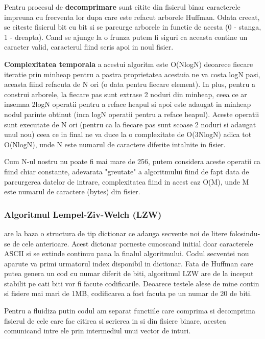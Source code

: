 \documentclass[runningheads]{llncs}
\begin{document}
Pentru procesul de \textbf{decomprimare} sunt citite din fisierul binar caracterele impreuna cu frecventa lor dupa care este refacut arborele
Huffman. Odata creeat, se citeste fisierul bit cu bit si se parcurge arborele in functie de acesta (0 - stanga, 1 - dreapta).
Cand se ajunge la o frunza putem fi siguri ca aceasta contine un caracter valid, caracterul fiind scris apoi in noul fisier.

\textbf{Complexitatea temporala} a acestui algoritm este O(NlogN) deoarece fiecare iteratie prin minheap pentru a pastra proprietatea
acestuia ne va costa logN pasi, aceasta fiind refacuta de N ori (o data pentru fiecare element).
In plus, pentru a construi arborele, la fiecare pas sunt extrase 2 noduri din minheap, ceea ce ar insemna 2logN operatii pentru a reface heapul
si apoi este adaugat in minheap nodul parinte obtinut (inca logN operatii pentru a reface heapul). Aceste operatii sunt executate de N ori (pentru
ca la fiecare pas sunt scoase 2 noduri si adaugat unul nou) ceea ce in final ne va duce la o complexitate de O(3NlogN) adica tot O(NlogN), unde
N este numarul de caractere diferite intalnite in fisier.

Cum N-ul nostru nu poate fi mai mare de 256, putem considera aceste operatii ca fiind chiar constante, adevarata "greutate" a algoritmului fiind de fapt
data de parcurgerea datelor de intrare, complexitatea fiind in acest caz O(M), unde M este numarul de caractere (bytes) din fisier.

\subsubsection{Algoritmul Lempel-Ziv-Welch (LZW)} are la baza o structura de tip dictionar ce adauga secvente noi de litere folosindu-se de cele
anterioare. Acest dictonar porneste cunoscand initial doar caracterele ASCII si se extinde continuu pana la finalul algoritmului.
Codul secventei nou aparute va primi urmatorul index disponibil in dictionar. Fata de Huffman care putea
genera un cod cu numar diferit de biti, algoritmul LZW are de la inceput stabilit pe cati biti vor fi facute codificarile. Deoarece testele alese de mine contin
si fisiere mai mari de 1MB, codificarea a fost facuta pe un numar de 20 de biti.

Pentru a fluidiza putin codul am separat functiile care comprima si decomprima fisierul de cele care fac citirea si scrierea in si din
fisiere binare, acestea comunicand intre ele prin intermediul unui vector de inturi.
\end{document}
